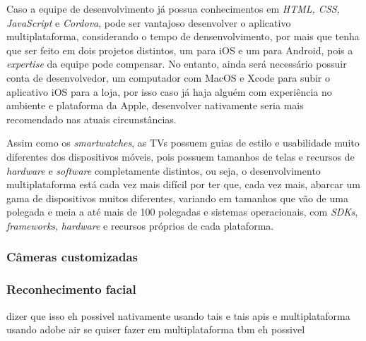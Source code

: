 Caso a equipe de desenvolvimento já possua conhecimentos em \textit{HTML, CSS, JavaScript} e \textit{Cordova}, pode ser vantajoso desenvolver o aplicativo multiplataforma, considerando o tempo de densenvolvimento, por 
mais que tenha que ser feito em dois projetos distintos, um para iOS e um para Android, pois a \textit{expertise} da equipe pode compensar. No entanto, ainda será necessário possuir conta de desenvolvedor, um computador com 
MacOS e Xcode para subir o aplicativo iOS para a loja, por isso caso já haja alguém com experiência no ambiente e plataforma da Apple, desenvolver nativamente seria mais recomendado nas atuais circunstâncias. 

Assim como os \textit{smartwatches}, as TVs possuem guias de estilo e usabilidade muito diferentes dos dispositivos móveis, pois possuem tamanhos de telas e recursos de \textit{hardware} e \textit{software} completamente 
distintos, ou seja, o desenvolvimento multiplataforma está cada vez mais difícil por ter que, cada vez mais, abarcar um gama de dispositivos muitos diferentes, variando em tamanhos que vão de uma polegada e meia a
até mais de 100 polegadas e sistemas operacionais, com \textit{SDKs}, \textit{frameworks}, \textit{hardware} e recursos próprios de cada plataforma. 

\subsubsection{Câmeras customizadas} \label{subsubsec:customcamera}

\subsubsection{Reconhecimento facial} \label{subsubsec:facial}
dizer que isso eh possivel nativamente usando tais e tais apis e multiplataforma usando adobe air 
se quiser fazer em multiplataforma tbm eh possivel